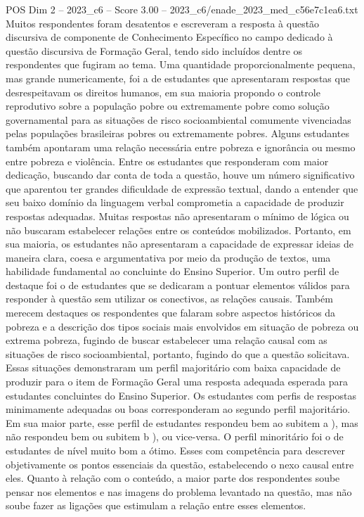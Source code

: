 \begin{textsample}{POS Dim 2 – 2023\_c6 – Score 3.00 – 2023\_c6/enade\_2023\_med\_c56e7c1ea6.txt}
Muitos respondentes foram desatentos e escreveram a resposta à questão discursiva de componente de Conhecimento Específico no campo dedicado à questão discursiva de Formação Geral, tendo sido incluídos dentre os respondentes que fugiram ao tema.
Uma quantidade proporcionalmente pequena, mas grande numericamente, foi a de estudantes que apresentaram respostas que desrespeitavam os direitos humanos, em sua maioria propondo o controle reprodutivo sobre a população pobre ou extremamente pobre como solução governamental para as situações de risco socioambiental comumente vivenciadas pelas populações brasileiras pobres ou extremamente pobres.
Alguns estudantes também apontaram uma relação necessária entre pobreza e ignorância ou mesmo entre pobreza e violência.
Entre os estudantes que responderam com maior dedicação, buscando dar conta de toda a questão, houve um número significativo que aparentou ter grandes dificuldade de expressão textual, dando a entender que seu baixo domínio da linguagem verbal comprometia a capacidade de produzir respostas adequadas.
Muitas respostas não apresentaram o mínimo de lógica ou não buscaram estabelecer relações entre os conteúdos mobilizados.
Portanto, em sua maioria, os estudantes não apresentaram a capacidade de expressar ideias de maneira clara, coesa e argumentativa por meio da produção de textos, uma habilidade fundamental ao concluinte do Ensino Superior.
Um outro perfil de destaque foi o de estudantes que se dedicaram a pontuar elementos válidos para responder à questão sem utilizar os conectivos, as relações causais.
Também merecem destaques os respondentes que falaram sobre aspectos históricos da pobreza e a descrição dos tipos sociais mais envolvidos em situação de pobreza ou extrema pobreza, fugindo de buscar estabelecer uma relação causal com as situações de risco socioambiental, portanto, fugindo do que a questão solicitava.
Essas situações demonstraram um perfil majoritário com baixa capacidade de produzir para o item de Formação Geral uma resposta adequada esperada para estudantes concluintes do Ensino Superior.
Os estudantes com perfis de respostas minimamente adequadas ou boas corresponderam ao segundo perfil majoritário.
Em sua maior parte, esse perfil de estudantes respondeu bem ao subitem a ), mas não respondeu bem ou subitem b ), ou vice-versa.
O perfil minoritário foi o de estudantes de nível muito bom a ótimo.
Esses com competência para descrever objetivamente os pontos essenciais da questão, estabelecendo o nexo causal entre eles.
Quanto à relação com o conteúdo, a maior parte dos respondentes soube pensar nos elementos e nas imagens do problema levantado na questão, mas não soube fazer as ligações que estimulam a relação entre esses elementos.

\end{textsample}
